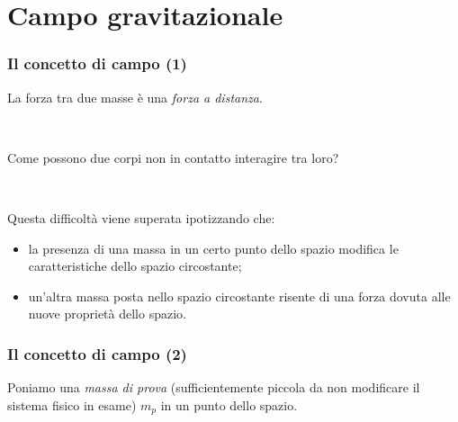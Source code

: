 \documentclass[]{beamer}
\theoremstyle{plain}
\begin{document}
\section{Campo gravitazionale}

\begin{frame}
\frametitle{Il concetto di campo (1)}
La forza tra due masse è una \emph{forza a distanza}.

~

Come possono due corpi non in contatto interagire tra loro?\pause

~

Questa difficoltà viene superata ipotizzando che:
\begin{itemize}
  \item la presenza di una massa in un certo punto dello spazio \alert<2>{modifica le caratteristiche dello spazio} circostante;\pause
  \item un'altra massa posta nello spazio circostante \alert<3>{risente di una forza dovuta alle nuove proprietà dello spazio}.
\end{itemize}
\end{frame}


\begin{frame}
\frametitle{Il concetto di campo (2)}

\begin{figure}
\end{figure}
Poniamo una \emph<1>{massa di prova} (sufficientemente piccola da non modificare il sistema fisico in esame) $ m_p $ in un punto dello spazio.

~

\end{frame}
\end{document}
